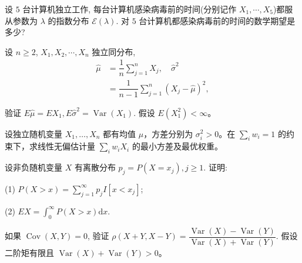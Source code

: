 \begin{exercise}[全部指数寿命结束的等待]\label{q:A5.17}
设 $5$ 台计算机独立工作, 每台计算机感染病毒前的时间(分别记作 $X_1,\cdots,X_5$)都服从参数为 $\lambda$ 的指数分布 $\mathcal{E}(\lambda)$. 对 $5$ 台计算机都感染病毒前的时间的数学期望是多少?\par{}\end{exercise}

\begin{exercise}[样本均值与方差的无偏性]\label{q:A5.20}
设 $n\geq 2$, $X_1,X_2,\cdots,X_n$ 独立同分布,
    \[\begin{aligned}\hat{\mu}&=\dfrac{1}{n}\sum\limits_{j=1}^nX_j,\quad\hat{\sigma}^2\\&=\dfrac{1}{n-1}\sum\limits_{j=1}^n(X_j-\hat{\mu})^2,\end{aligned}\]

    验证 $E\hat{\mu}=EX_1,E\hat{\sigma}^2=\operatorname{Var}(X_1)$. 假设 $E(X_1^2)<\infty$。\par{}\end{exercise}

\begin{exercise}[最优逆方差加权]\label{q:A5.22}
设独立随机变量 $X_1,\ldots,X_n$ 都有均值 $\mu$，方差分别为 $\sigma_i^2>0$。在 $\sum_iw_i=1$ 的约束下，求线性无偏估计量 $\sum_iw_iX_i$ 的最小方差及最优权重。\par{}\end{exercise}

\begin{exercise}[非负变量的尾积分]\label{q:A5.25}
设非负随机变量 $X$ 有离散分布 $p_j=P(X=x_j),j\geq 1$. 证明:
    
    (1) $P(X>x)=\sum\limits_{j=1}^\infty p_jI[x<x_j]$;

    (2) $EX=\int_0^\infty P(X>x)\mathrm{d}x$.\par{}\end{exercise}

\begin{exercise}[和与差的相关系数]\label{q:A5.26}
如果 $\operatorname{Cov}(X,Y)=0$, 验证 $\rho(X+Y,X-Y)=\dfrac{\operatorname{Var}(X)-\operatorname{Var}(Y)}{\operatorname{Var}(X)+\operatorname{Var}(Y)}$. 假设二阶矩有限且 $\operatorname{Var}(X)+\operatorname{Var}(Y)>0$。\par{}\end{exercise}

